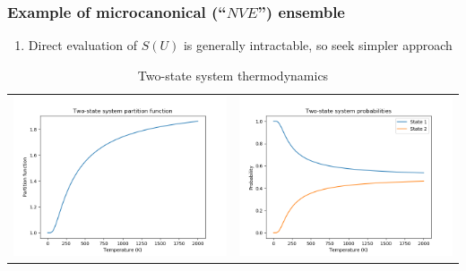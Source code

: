 \documentclass[11pt]{article}
\begin{document}
\subsubsection{Example of microcanonical (``\(NVE\)'') ensemble}
\label{sec:org99c5465}
\begin{enumerate}
\item Direct evaluation of \(S(U)\) is generally intractable, so seek simpler approach
\end{enumerate}
\begin{table}
   \caption{Two-state system thermodynamics}
\begin{tabular}{cc}
\includegraphics[scale=0.5]{Images/2state-partition.png} & \includegraphics[scale=0.5]{Images/2state-probability.png} \\

\end{tabular}
\end{table}
\end{document}
